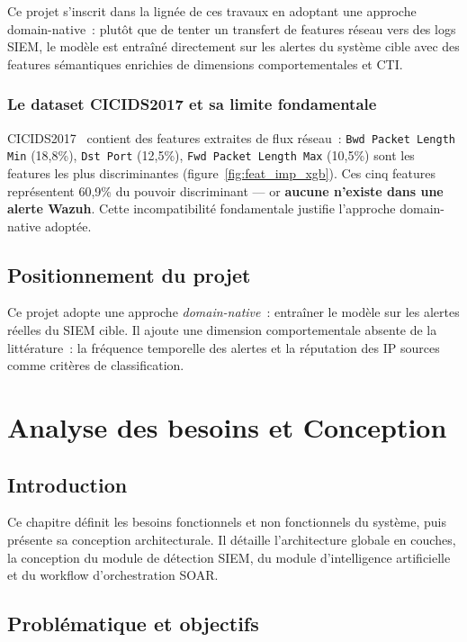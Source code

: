 \documentclass[12pt,a4paper]{report}
\begin{document}
Ce projet s'inscrit dans la lignée de ces travaux en adoptant une approche domain-native~: plutôt que de tenter un transfert de features réseau vers des logs SIEM, le modèle est entraîné directement sur les alertes du système cible avec des features sémantiques enrichies de dimensions comportementales et CTI.

\subsection{Le dataset CICIDS2017 et sa limite fondamentale}

CICIDS2017~\cite{cicids2017} contient des features extraites de flux réseau~: \texttt{Bwd Packet Length Min} (18,8\%), \texttt{Dst Port} (12,5\%), \texttt{Fwd Packet Length Max} (10,5\%) sont les features les plus discriminantes (figure~\ref{fig:feat_imp_xgb}). Ces cinq features représentent 60,9\% du pouvoir discriminant — or \textbf{aucune n'existe dans une alerte Wazuh}. Cette incompatibilité fondamentale justifie l'approche domain-native adoptée.

\section{Positionnement du projet}

Ce projet adopte une approche \textit{domain-native}~: entraîner le modèle sur les alertes réelles du SIEM cible. Il ajoute une dimension comportementale absente de la littérature~: la fréquence temporelle des alertes et la réputation des IP sources comme critères de classification.

\chapter{Analyse des besoins et Conception}
\label{chap:besoins}

\section*{Introduction}
Ce chapitre définit les besoins fonctionnels et non fonctionnels
du système, puis présente sa conception architecturale. Il détaille
l'architecture globale en couches, la conception du module de
détection SIEM, du module d'intelligence artificielle et du
workflow d'orchestration SOAR.

\section{Problématique et objectifs}
\end{document}
